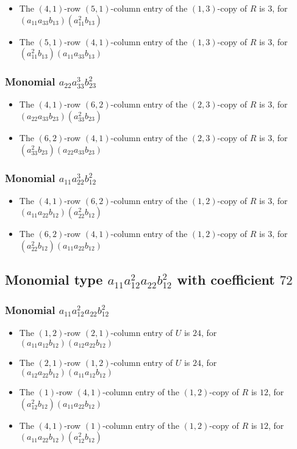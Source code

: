 \documentclass{article}
\begin{document}
\begin{itemize}
\item The $(4, 1)$-row $(5, 1)$-column entry of the $ \left(1, 3\right) $-copy of $R$ is $ 3 $, for $( a_{11} a_{33} b_{13} )( a_{11}^{2} b_{13} )$ 
\item The $(5, 1)$-row $(4, 1)$-column entry of the $ \left(1, 3\right) $-copy of $R$ is $ 3 $, for $( a_{11}^{2} b_{13} )( a_{11} a_{33} b_{13} )$ 
\end{itemize}
\subsubsection{Monomial $ a_{22} a_{33}^{3} b_{23}^{2} $}

\begin{itemize}
\item The $(4, 1)$-row $(6, 2)$-column entry of the $ \left(2, 3\right) $-copy of $R$ is $ 3 $, for $( a_{22} a_{33} b_{23} )( a_{33}^{2} b_{23} )$ 
\item The $(6, 2)$-row $(4, 1)$-column entry of the $ \left(2, 3\right) $-copy of $R$ is $ 3 $, for $( a_{33}^{2} b_{23} )( a_{22} a_{33} b_{23} )$ 
\end{itemize}
\subsubsection{Monomial $ a_{11} a_{22}^{3} b_{12}^{2} $}

\begin{itemize}
\item The $(4, 1)$-row $(6, 2)$-column entry of the $ \left(1, 2\right) $-copy of $R$ is $ 3 $, for $( a_{11} a_{22} b_{12} )( a_{22}^{2} b_{12} )$ 
\item The $(6, 2)$-row $(4, 1)$-column entry of the $ \left(1, 2\right) $-copy of $R$ is $ 3 $, for $( a_{22}^{2} b_{12} )( a_{11} a_{22} b_{12} )$ 
\end{itemize}
\subsection{Monomial type $ a_{11} a_{12}^{2} a_{22} b_{12}^{2} $ with coefficient $ 72 $}

\subsubsection{Monomial $ a_{11} a_{12}^{2} a_{22} b_{12}^{2} $}

\begin{itemize}
\item The $ \left(1, 2\right) $-row $ \left(2, 1\right) $-column entry of $U$ is $ 24 $, for $( a_{11} a_{12} b_{12} )( a_{12} a_{22} b_{12} )$ 
\item The $ \left(2, 1\right) $-row $ \left(1, 2\right) $-column entry of $U$ is $ 24 $, for $( a_{12} a_{22} b_{12} )( a_{11} a_{12} b_{12} )$ 
\item The $(1)$-row $(4, 1)$-column entry of the $ \left(1, 2\right) $-copy of $R$ is $ 12 $, for $( a_{12}^{2} b_{12} )( a_{11} a_{22} b_{12} )$ 
\item The $(4, 1)$-row $(1)$-column entry of the $ \left(1, 2\right) $-copy of $R$ is $ 12 $, for $( a_{11} a_{22} b_{12} )( a_{12}^{2} b_{12} )$ 
\end{itemize}
\end{document}
